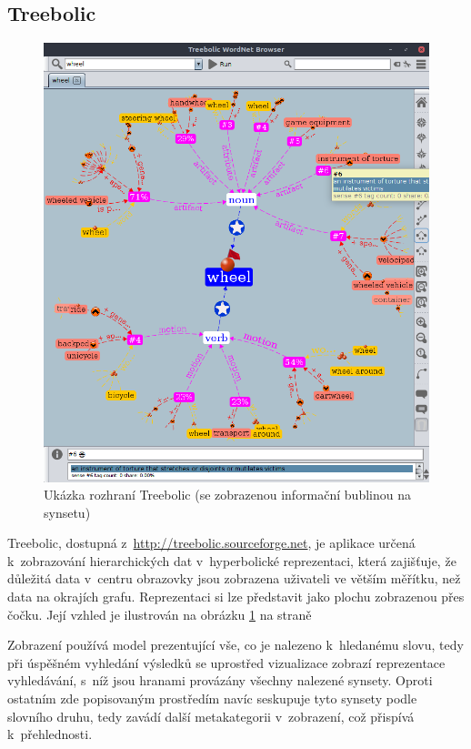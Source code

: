 \documentclass[a4paper, 11pt, oneside, showtrims]{book}
\begin{document}
				\subsection{Treebolic}

					\begin{figure}[ht]
						\centering
						\includegraphics[width=1.0\textwidth]{wntreebolic.png}
						\caption{Ukázka rozhraní Treebolic (se zobrazenou informační bublinou na synsetu)}
						\label{fig:wntreebolic}
					\end{figure}

					Treebolic, dostupná z~\url{http://treebolic.sourceforge.net}, je aplikace určená k~zobrazování hierarchických dat v~hyperbolické reprezentaci, která zajišťuje, že důležitá data v~centru obrazovky jsou zobrazena uživateli ve větším měřítku, než data na okrajích grafu. Reprezentaci si lze představit jako plochu zobrazenou přes čočku. \parencite{boutreebolic} Její vzhled je ilustrován na obrázku \ref{fig:wntreebolic} na straně \pageref{fig:wntreebolic}

					Zobrazení používá model prezentující vše, co je nalezeno k~hledanému slovu, tedy při úspěšném vyhledání výsledků se uprostřed vizualizace zobrazí reprezentace vyhledávání, s~níž jsou hranami provázány všechny nalezené synsety. Oproti ostatním zde popisovaným prostředím navíc seskupuje tyto synsety podle slovního druhu, tedy zavádí další metakategorii v~zobrazení, což přispívá k~přehlednosti. 
\end{document}
